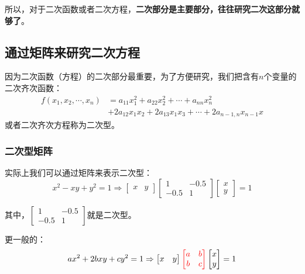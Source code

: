 \documentclass[12pt]{article}
\begin{document}
所以，对于二次函数或者二次方程，\textbf{二次部分是主要部分，往往研究二次这部分就够了}。

\subsection{通过矩阵来研究二次方程}
因为二次函数（方程）的二次部分最重要，为了方便研究，我们把含有$n$个变量的二次齐次函数：
\begin{align*}
f(x_1, x_2, \cdots, x_n) &= a_{11}x_1^2 + a_{22}x_2^2 + \cdots + a_{nn}x_n^2 \\
 &+ 2a_{12}x_1x_2 + 2a_{13}x_1x_3 + \cdots + 2a_{n-1,n}x_{n-1}x
\end{align*}
或者二次齐次方程称为二次型。

\subsubsection{二次型矩阵}
实际上我们可以通过矩阵来表示二次型：
$$
x^2 - xy + y^2 = 1 \Rightarrow 
\begin{bmatrix}x & y\end{bmatrix}
\begin{bmatrix}1&-0.5\\-0.5&1\end{bmatrix}
\begin{bmatrix}x \\ y\end{bmatrix} = 1
$$

其中，$\left[\begin{smallmatrix}1&-0.5\\-0.5&1\end{smallmatrix}\right]$就是二次型。

更一般的：
$$
ax^2 + 2bxy + cy^2 = 1\Rightarrow 
\begin{bmatrix}x & y\end{bmatrix}
\textcolor{red}{\begin{bmatrix}a&b\\b&c\end{bmatrix}}
\begin{bmatrix}x \\ y\end{bmatrix} = 1
$$
\end{document}

